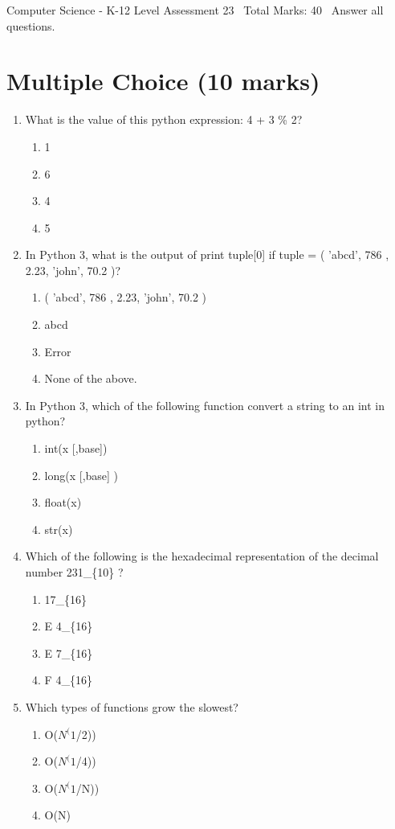 \documentclass[12pt]{article}
\begin{document}
\begin{center}
Computer Science - K-12 Level Assessment 23 \
Total Marks: 40 \
Answer all questions.
\end{center}

\section*{Multiple Choice (10 marks)}
\begin{enumerate}[label=\arabic*.]
\item What is the value of this python expression: 4 + 3 \% 2?
\begin{enumerate}[label=(\alph*)]
    \item 1
    \item 6
    \item 4
    \item 5
\end{enumerate}
\item In Python 3, what is the output of print tuple[0] if tuple = ( 'abcd', 786 , 2.23, 'john', 70.2 )?
\begin{enumerate}[label=(\alph*)]
    \item ( 'abcd', 786 , 2.23, 'john', 70.2 )
    \item abcd
    \item Error
    \item None of the above.
\end{enumerate}
\item In Python 3, which of the following function convert a string to an int in python?
\begin{enumerate}[label=(\alph*)]
    \item int(x [,base])
    \item long(x [,base] )
    \item float(x)
    \item str(x)
\end{enumerate}
\item Which of the following is the hexadecimal representation of the decimal number 231\_\{10\} ?
\begin{enumerate}[label=(\alph*)]
    \item 17\_\{16\}
    \item E 4\_\{16\}
    \item E 7\_\{16\}
    \item F 4\_\{16\}
\end{enumerate}
\item Which types of functions grow the slowest?
\begin{enumerate}[label=(\alph*)]
    \item O($N^(1$/2))
    \item O($N^(1$/4))
    \item O($N^(1$/N))
    \item O(N)
\end{enumerate}
\end{enumerate}
\end{document}
